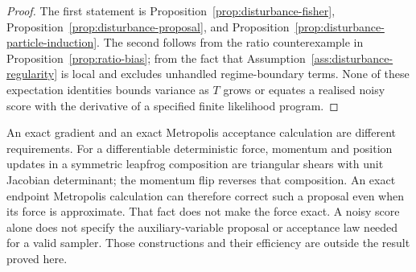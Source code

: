 \documentclass[11pt]{article}
\begin{document}
\begin{proof}
The first statement is Proposition~\ref{prop:disturbance-fisher},
Proposition~\ref{prop:disturbance-proposal}, and
Proposition~\ref{prop:disturbance-particle-induction}. The second follows from the
ratio counterexample in Proposition~\ref{prop:ratio-bias}; from the fact that
Assumption~\ref{ass:disturbance-regularity} is local and excludes unhandled
regime-boundary terms. None of these expectation identities bounds variance
as $T$ grows or equates a realised noisy score with the derivative of a
specified finite likelihood program.
\end{proof}

An exact gradient and an exact Metropolis acceptance calculation are
different requirements. For a differentiable deterministic force, momentum
and position updates in a symmetric leapfrog composition are triangular
shears with unit Jacobian determinant; the momentum flip reverses that
composition. An exact endpoint Metropolis calculation can therefore
correct such a proposal even when its force is approximate. That fact does
not make the force exact. A noisy score alone
does not specify the auxiliary-variable proposal or acceptance law needed
for a valid sampler. Those constructions and their efficiency are outside
the result proved here.


\clearpage


\end{document}
